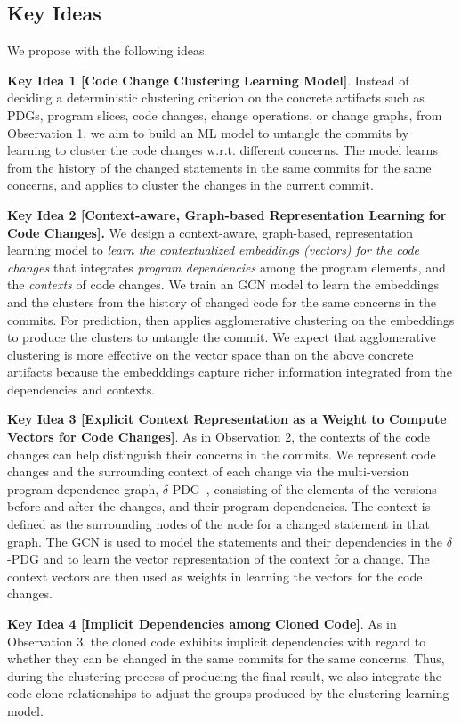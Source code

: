 \subsection{Key Ideas}
\label{ideas:sec}

We propose {\tool} with the following ideas.


{\bf Key Idea 1 [Code Change Clustering Learning Model]}. Instead of
deciding a deterministic clustering criterion on the concrete
artifacts such as PDGs, program slices, code changes, change
operations, or change graphs, from Observation 1, we aim to build an
ML model to untangle the commits by learning to cluster the code
changes w.r.t. different concerns. The model learns from the
history of the changed statements in the same commits for the same
concerns, and applies to cluster the changes in the current commit.

{\bf Key Idea 2 [Context-aware, Graph-based Representation Learning
    for Code Changes].} We design a context-aware, graph-based,
representation learning model to {\em learn the contextualized
  embeddings (vectors) for the code changes} that integrates {\em
  program dependencies} among the program elements, and the {\em
  contexts} of code changes. We train an GCN model to learn the
embeddings and the clusters from the history of changed code for the
same concerns in the commits. For prediction, {\tool} then applies
agglomerative clustering on the embeddings to produce the clusters to
untangle the commit. We expect that agglomerative clustering is more
effective on the vector space than on the above concrete artifacts
because the embedddings capture richer information integrated from the
dependencies and contexts.


{\bf Key Idea 3 [Explicit Context Representation as a Weight to
    Compute Vectors for Code Changes]}. As in Observation 2, the
contexts of the code changes can help distinguish their
concerns in the commits. We represent code changes and the
surrounding context of each change via the multi-version program
dependence graph, $\delta$-PDG~\cite{flexeme-fse20}, consisting of the
elements of the versions before and after the changes, and their
program dependencies. The context is defined as the surrounding nodes
of the node for a changed statement in that graph. The GCN is used to
model the statements and their dependencies in the $\delta$-PDG and to
learn the vector representation of the context for a change. The
context vectors are then used as weights in learning the vectors for the
code changes.

{\bf Key Idea 4 [Implicit Dependencies among Cloned Code]}. As in
Observation 3, the cloned code exhibits implicit dependencies with
regard to whether they can be changed in the same commits for the same
concerns. Thus, during the clustering process of producing the final
result, we also integrate the code clone relationships to
adjust the groups produced by the clustering learning model.

